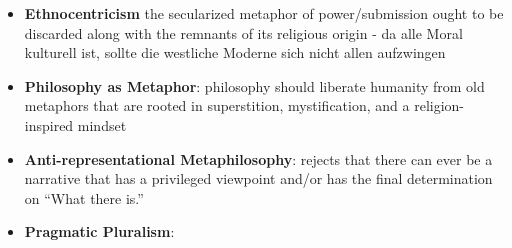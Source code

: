 \documentclass[emulatestandardclasses]{scrartcl}
\begin{document}
\begin{itemize}
  \item \textbf{Ethnocentricism} the secularized metaphor of power/submission ought to be discarded along with the remnants of its religious origin - da alle Moral kulturell ist, sollte die westliche Moderne sich nicht allen aufzwingen
  \item \textbf{Philosophy as Metaphor}: philosophy should liberate humanity from old metaphors that are rooted in superstition, mystification, and a religion-inspired mindset
  \item \textbf{Anti-representational Metaphilosophy}: rejects that there can ever be a narrative that has a privileged viewpoint and/or has the final determination on “What there is.”
  \item \textbf{Pragmatic Pluralism}: 
\end{itemize}



\newpage
%


\end{document}
